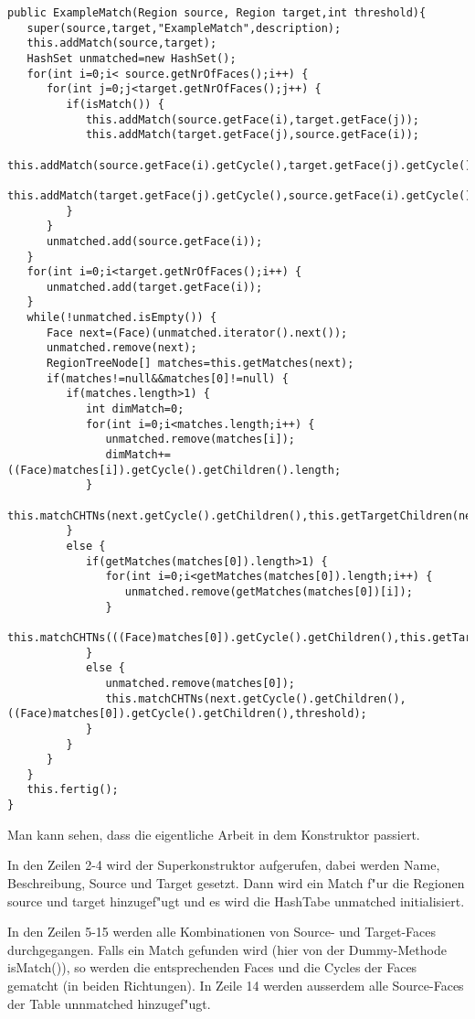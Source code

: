 \documentclass[a4paper,10pt,twoside]{scrreprt}
\begin{document}
\begin{lstlisting}
public ExampleMatch(Region source, Region target,int threshold){
   super(source,target,"ExampleMatch",description);
   this.addMatch(source,target);
   HashSet unmatched=new HashSet();
   for(int i=0;i< source.getNrOfFaces();i++) {
      for(int j=0;j<target.getNrOfFaces();j++) {                         
         if(isMatch()) {
            this.addMatch(source.getFace(i),target.getFace(j));
            this.addMatch(target.getFace(j),source.getFace(i));
            this.addMatch(source.getFace(i).getCycle(),target.getFace(j).getCycle());
            this.addMatch(target.getFace(j).getCycle(),source.getFace(i).getCycle());
         }
      }
      unmatched.add(source.getFace(i));
   }
   for(int i=0;i<target.getNrOfFaces();i++) {
      unmatched.add(target.getFace(i));
   }
   while(!unmatched.isEmpty()) {
      Face next=(Face)(unmatched.iterator().next());
      unmatched.remove(next);
      RegionTreeNode[] matches=this.getMatches(next);
      if(matches!=null&&matches[0]!=null) {
         if(matches.length>1) {
            int dimMatch=0;
            for(int i=0;i<matches.length;i++) {
               unmatched.remove(matches[i]);
               dimMatch+=((Face)matches[i]).getCycle().getChildren().length;
            }
            this.matchCHTNs(next.getCycle().getChildren(),this.getTargetChildren(next),threshold);
         }
         else {
            if(getMatches(matches[0]).length>1) {
               for(int i=0;i<getMatches(matches[0]).length;i++) {
                  unmatched.remove(getMatches(matches[0])[i]);
               }
               this.matchCHTNs(((Face)matches[0]).getCycle().getChildren(),this.getTargetChildren(matches[0]),threshold);
            }
            else {
               unmatched.remove(matches[0]);
               this.matchCHTNs(next.getCycle().getChildren(),((Face)matches[0]).getCycle().getChildren(),threshold);
            }
         }
      }
   }
   this.fertig();
}
\end{lstlisting}
Man kann sehen, dass die eigentliche Arbeit in dem Konstruktor passiert. 

In den Zeilen 2-4 wird der Superkonstruktor aufgerufen, dabei werden Name, Beschreibung, Source und Target gesetzt. Dann wird ein Match f"ur die Regionen source und target hinzugef"ugt und es wird die HashTabe unmatched initialisiert.

In den Zeilen 5-15 werden alle Kombinationen von Source- und Target-Faces durchgegangen. Falls ein Match gefunden wird (hier von der Dummy-Methode isMatch()), so werden die entsprechenden Faces und die Cycles der Faces gematcht (in beiden Richtungen). In Zeile 14 werden ausserdem alle Source-Faces der Table unnmatched hinzugef"ugt.
\end{document}
